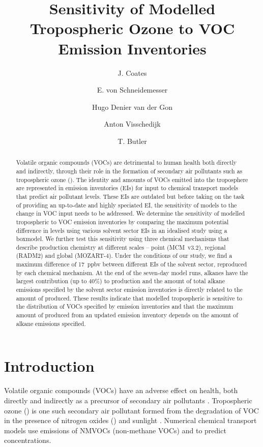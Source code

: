 \documentclass[14pt]{extarticle}
\title{Sensitivity of Modelled Tropospheric Ozone to VOC Emission Inventories}
\author[1]{J. Coates}
\author[1]{E. von Schneidemesser}
\author[2]{Hugo Denier van der Gon}
\author[2]{Anton Visschedijk}
\author[1]{T. Butler}
\affil[1]{Institute for Advanced Sustainability Studies, Potsdam, Germany}
\affil[2]{TNO Built Environment and Geosciences, Utrecht, The Netherlands}
\begin{document}
\maketitle

\begin{abstract}
    Volatile organic compounds (VOCs) are detrimental to human health both directly and indirectly, through their role in the formation of secondary air pollutants such as tropospheric ozone ().
    The identity and amounts of VOCs emitted into the troposphere are represented in emission inventories (EIs) for input to chemical transport models that predict air pollutant levels.
    These EIs are outdated but before taking on the task of providing an up-to-date and highly speciated EI, the sensitivity of models to the change in VOC input needs to be addressed.
    We determine the sensitivity of modelled tropospheric  to VOC emission inventories by comparing the maximum potential difference in  levels using various solvent sector EIs in an idealised study using a boxmodel.
    We further test this sensitivity using three chemical mechanisms that describe  production chemistry at different scales -- point (MCM~v3.2), regional (RADM2) and global (MOZART-4).
    Under the conditions of our study, we find a maximum difference of 17~ppbv between different EIs of the solvent sector, reproduced by each chemical mechanism. 
    At the end of the seven-day model runs, alkanes have the largest contribution (up to $40$\%) to  production and the amount of total alkane emissions specified by the solvent sector emission inventories is directly related to the amount of  produced.
    These results indicate that modelled tropospheric  is sensitive to the distribution of VOCs specified by emission inventories and that the maximum amount of  produced from an updated emission inventory depends on the amount of alkane emissions specified.
\end{abstract}

\section{Introduction}

Volatile organic compounds (VOCs) have an adverse effect on health, both directly and indirectly as a precursor of secondary air pollutants \citep{Laurent:2014}.
Tropospheric ozone () is one such secondary air pollutant formed from the degradation of VOC in the presence of nitrogen oxides () and sunlight \citep{Atkinson:2000}.
Numerical chemical transport models use emissions of NMVOCs (non-methane VOCs) and  to predict  concentrations.
\end{document}
